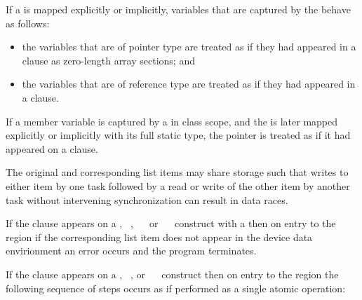 \begin{cppspecific}
If a  is mapped explicitly or implicitly, variables
that are captured by the  behave as follows:

\begin{itemize}
\item the variables that are of pointer type are treated as if they had
      appeared in a  clause as zero-length array sections; and 
\item the variables that are of reference type are treated as if they
      had appeared in a  clause.
\end{itemize}

If a member variable is captured by a  in class scope, and
the  is later mapped explicitly or implicitly with its
full static type, the  pointer is treated as if it had
appeared on a  clause.
\end{cppspecific}

The original and corresponding list items may share storage such that writes to 
either item by one task followed by a read or write of the other item by another 
task without intervening synchronization can result in data races.

If the  clause appears on a , ~,
~~ or  ~~
construct with a   then on entry to
the region if the corresponding list item does not appear in the device data
envirionment an error occurs and the program terminates.

If the  clause appears on a , ~, 
or ~~ construct then on entry to the region 
the following sequence of steps occurs as if performed as a single atomic operation:

